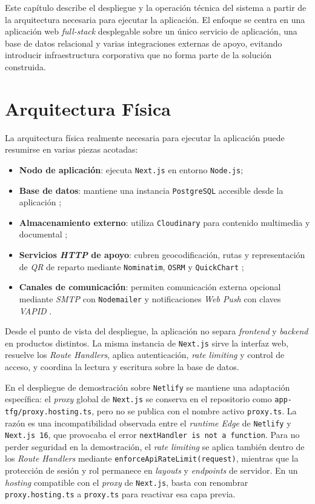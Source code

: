 Este capítulo describe el despliegue y la operación técnica del sistema a partir de la arquitectura necesaria para ejecutar la aplicación. El enfoque se centra en una aplicación web \textit{full-stack} desplegable sobre un único servicio de aplicación, una base de datos relacional y varias integraciones externas de apoyo, evitando introducir infraestructura corporativa que no forma parte de la solución construida.

\section{Arquitectura Física}

La arquitectura física realmente necesaria para ejecutar la aplicación puede resumirse en varias piezas acotadas:

\begin{itemize}
    \item \textbf{Nodo de aplicación}: ejecuta \texttt{Next.js} en entorno \texttt{Node.js};
    \item \textbf{Base de datos}: mantiene una instancia \texttt{PostgreSQL} accesible desde la aplicación \citep{postgresdocs2026};
    \item \textbf{Almacenamiento externo}: utiliza \texttt{Cloudinary} para contenido multimedia y documental \citep{cloudinaryupload2026};
    \item \textbf{Servicios \textit{HTTP} de apoyo}: cubren geocodificación, rutas y representación de \textit{QR} de reparto mediante \texttt{Nominatim}, \texttt{OSRM} y \texttt{QuickChart} \citep{nominatimapi2026,osrmdocs2026,quickchartqr2026};
    \item \textbf{Canales de comunicación}: permiten comunicación externa opcional mediante \textit{SMTP} con \texttt{Nodemailer} y notificaciones \textit{Web Push} con claves \textit{VAPID} \citep{nodemailersmtp2026,webpushapi2026,webpushlibs2026}.
\end{itemize}

Desde el punto de vista del despliegue, la aplicación no separa \textit{frontend} y \textit{backend} en productos distintos. La misma instancia de \texttt{Next.js} sirve la interfaz web, resuelve los \textit{Route Handlers}, aplica autenticación, \textit{rate limiting} y control de acceso, y coordina la lectura y escritura sobre la base de datos.

En el despliegue de demostración sobre \texttt{Netlify} se mantiene una adaptación específica: el \textit{proxy} global de \texttt{Next.js} se conserva en el repositorio como \texttt{app-tfg/proxy.hosting.ts}, pero no se publica con el nombre activo \texttt{proxy.ts}. La razón es una incompatibilidad observada entre el \textit{runtime Edge} de \texttt{Netlify} y \texttt{Next.js 16}, que provocaba el error \texttt{nextHandler is not a function}. Para no perder seguridad en la demostración, el \textit{rate limiting} se aplica también dentro de los \textit{Route Handlers} mediante \texttt{enforceApiRateLimit(request)}, mientras que la protección de sesión y rol permanece en \textit{layouts} y \textit{endpoints} de servidor. En un \textit{hosting} compatible con el \textit{proxy} de \texttt{Next.js}, basta con renombrar \texttt{proxy.hosting.ts} a \texttt{proxy.ts} para reactivar esa capa previa.

